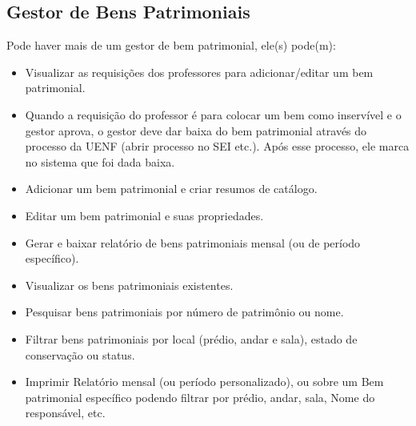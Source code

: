 \subsection{Gestor de Bens Patrimoniais}
Pode haver mais de um gestor de bem patrimonial, ele(s) pode(m):
\begin{itemize}
    \item Visualizar as requisições dos professores para adicionar/editar um bem patrimonial.
    \item Quando a requisição do professor é para colocar um bem como inservível e o gestor aprova, o gestor deve dar baixa do bem patrimonial através do processo da UENF (abrir processo no SEI etc.). Após esse processo, ele marca no sistema que foi dada baixa.
    \item Adicionar um bem patrimonial e criar resumos de catálogo.
    \item Editar um bem patrimonial e suas propriedades.
    \item Gerar e baixar relatório de bens patrimoniais mensal (ou de período específico).
    \item Visualizar os bens patrimoniais existentes.
    \item Pesquisar bens patrimoniais por número de patrimônio ou nome.
    \item Filtrar bens patrimoniais por local (prédio, andar e sala), estado de conservação ou status.
    \item Imprimir Relatório mensal (ou período personalizado), ou sobre um Bem patrimonial específico podendo filtrar por prédio, andar, sala, Nome do responsável, etc.
\end{itemize}

